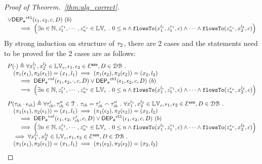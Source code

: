 \begin{proof}[Proof of Theorem.~\ref{thm:alg_correct}]
\[\begin{array}{l}
\lor
\mathsf{DEP_{\mathtt{e}}}^{\mathtt{{ctl}}}(\mathtt{\epsilon}_1, \mathtt{\epsilon}_2, c, D)  ~ (b)
 \\ \qquad \implies
   \Big(\exists  n \in \mathbb{N}, z_1^{r_1}, \cdots, z_n^{r_n} \in \mathbb{LV}_{{c}} ~.~ 0 \leq n
 \land \mathtt{flowsTo}(x_1^{l_1}, z_1^{r_1}, c) \land \cdots \land \mathtt{flowsTo}(z_n^{r_n}, {x}_2^{l_2}, c) \Big)
\end{array}
\]
%
%
By strong induction on structure of $\vtrace_2$, there are 2 cases and the statements need to be proved for the 2 cases are as follows:
%
$$
\begin{array}{l}
P(\cdot)
 \triangleq
\forall {x}_1^{l_1}, {x}_2^{l_2} \in \lvar_{{c}},
\event_1, \event_2 \in \eventset^{\asn}, D \in \dbdom \st
\\ \quad
(\pi_{1}{(\event_1)}, \pi_{2}{(\event_1)}) = ({x}_1, l_1)
\implies
(\pi_{1}{(\event_2)}, \pi_{2}{(\event_2)}) = ({x}_2, l_2)
 \\ \qquad \implies 
\eventdep^{val}(\event_1, \event_2, \cdot, c, D)
\lor
\eventdep^{\ctl}(\event_1, \event_2, c, D)  ~ (b)
  \\ \qquad \implies
   \Big(\exists  n \in \mathbb{N}, z_1^{r_1}, \cdots, z_n^{r_n} \in \lvar_{{c}} \st 0 \leq n
 \land \flowsto(x_1^{l_1}, z_1^{r_1}, c) \land \cdots \land \flowsto(z_n^{r_n}, {x}_2^{l_2}, c) \Big)
\end{array}
$$
%
$$
\begin{array}{l}
P(\trace_{ih} \cdot \event_{ih})
\triangleq 
\forall \trace_{ih}', \trace_{ih}'' \in \mathcal{T} \st \trace_{ih} = \trace_{ih}' \tracecat \trace_{ih}'' \st
\forall {x}_1^{l_1}, {x}_2^{l_2} \in \lvar_{{c}},
\event_1, \event_2 \in \eventset^{\asn}, D \in \dbdom \st
\\ \quad
(\pi_{1}{(\event_1)}, \pi_{2}{(\event_1)}) = ({x}_1, l_1)
\implies
(\pi_{1}{(\event_2)}, \pi_{2}{(\event_2)}) = ({x}_2, l_2)
 \\ \qquad \implies 
\eventdep^{val}(\event_1, \event_2, \trace_{ih}', c, D)
\lor
\eventdep^{\ctl}(\event_1, \event_2, c, D)  ~ (b)
  \\ \qquad \implies
   \Big(\exists  n \in \mathbb{N}, z_1^{r_1}, \cdots, z_n^{r_n} \in \lvar_{{c}} \st 0 \leq n
 \land \flowsto(x_1^{l_1}, z_1^{r_1}, c) \land \cdots \land \flowsto(z_n^{r_n}, {x}_2^{l_2}, c) \Big)
\\ \quad \implies
\forall {x}_1^{l_1}, {x}_2^{l_2} \in \lvar_{{c}},
\event_1, \event_2 \in \eventset^{\asn}, D \in \dbdom \st
\\ \quad
(\pi_{1}{(\event_1)}, \pi_{2}{(\event_1)}) = ({x}_1, l_1)
\implies
(\pi_{1}{(\event_2)}, \pi_{2}{(\event_2)}) = ({x}_2, l_2)

\end{array}$$
\end{proof}
